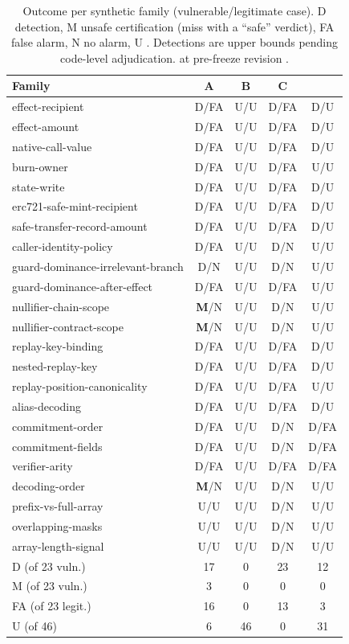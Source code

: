 \begin{table}[t]
\centering
\caption{Outcome per synthetic family (vulnerable/legitimate case).
D detection, M unsafe certification (miss with a ``safe'' verdict), FA false
alarm, N no alarm, U \UNK{}. Detections are upper bounds pending code-level
adjudication. \tool{} at pre-freeze revision .}
\label{tab:toolpattern}
\scriptsize
\setlength{\tabcolsep}{2.5pt}
\begin{tabular}{@{}lcccc@{}}
\toprule
\textbf{Family} & \textbf{A} & \textbf{B} & \textbf{C} & \textbf{\tool{}} \\
\midrule
effect-recipient & D/FA & U/U & D/FA & D/U \\
effect-amount & D/FA & U/U & D/FA & D/U \\
native-call-value & D/FA & U/U & D/FA & D/U \\
burn-owner & D/FA & U/U & D/FA & U/U \\
state-write & D/FA & U/U & D/FA & D/U \\
erc721-safe-mint-recipient & D/FA & U/U & D/FA & D/U \\
safe-transfer-record-amount & D/FA & U/U & D/FA & D/U \\
caller-identity-policy & D/FA & U/U & D/N & U/U \\
guard-dominance-irrelevant-branch & D/N & U/U & D/N & U/U \\
guard-dominance-after-effect & D/FA & U/U & D/FA & U/U \\
nullifier-chain-scope & \textbf{M}/N & U/U & D/N & U/U \\
nullifier-contract-scope & \textbf{M}/N & U/U & D/N & U/U \\
replay-key-binding & D/FA & U/U & D/FA & D/U \\
nested-replay-key & D/FA & U/U & D/FA & D/U \\
replay-position-canonicality & D/FA & U/U & D/FA & U/U \\
alias-decoding & D/FA & U/U & D/FA & D/U \\
commitment-order & D/FA & U/U & D/N & D/FA \\
commitment-fields & D/FA & U/U & D/N & D/FA \\
verifier-arity & D/FA & U/U & D/FA & D/FA \\
decoding-order & \textbf{M}/N & U/U & D/N & U/U \\
prefix-vs-full-array & U/U & U/U & D/N & U/U \\
overlapping-masks & U/U & U/U & D/N & U/U \\
array-length-signal & U/U & U/U & D/N & U/U \\
\midrule
D (of 23 vuln.) & 17 & 0 & 23 & 12 \\
M (of 23 vuln.) & 3 & 0 & 0 & 0 \\
FA (of 23 legit.) & 16 & 0 & 13 & 3 \\
U (of 46) & 6 & 46 & 0 & 31 \\
\bottomrule
\end{tabular}
\end{table}

